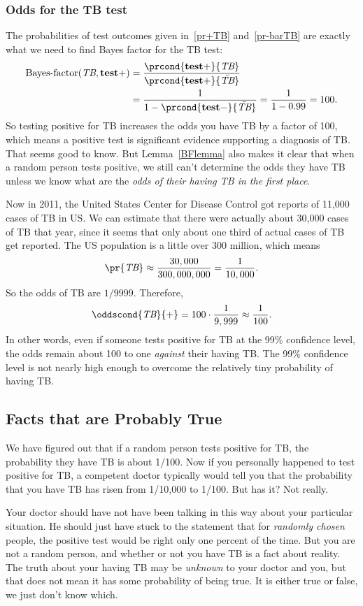 \subsubsection{Odds for the TB test}
The probabilities of test outcomes given in~\eqref{pr+TB}
and~\eqref{pr-barTB} are exactly what we need to find Bayes factor for
the TB test:
\begin{align*}
\BF{\TB}{\testplus}
 & =\frac{\prcond{\testplus}{\TB}}{\prcond{\testplus}{\bar{\TB}}}\\
 &  =\frac{1}{1-\prcond{\testminus}{\bar{\TB}}} = \frac{1}{1 - 0.99} = 100.
\end{align*}
So testing positive for TB increases the odds you have TB by a factor
of 100, which means a positive test is significant evidence supporting
a diagnosis of TB.  That seems good to know.  But Lemma~\ref{BFlemma}
also makes it clear that when a random person tests positive, we still
can't determine the odds they have TB unless we know what are the
\emph{odds of their having TB in the first place}.

Now in 2011, the United States Center for Disease Control got reports
of 11,000 cases of TB in US.  We can estimate that there were actually
about 30,000 cases of TB that year, since it seems that only about one
third of actual cases of TB get reported.  The US population is a
little over 300 million, which means
\[
\pr{\TB} \approx \frac{30,000}{300,000,000} = \frac{1}{10,000}.
\]
So the odds of TB are $1/9999$.  Therefore,
\[
\oddscond{\TB}{\text+} = 100 \cdot \frac{1}{9,999} \approx \frac{1}{100}.
\]
In other words, even if someone tests positive for TB at the 99\%
confidence level, the odds remain about 100 to one \emph{against}
their having TB.  The 99\% confidence level is not nearly high enough
to overcome the relatively tiny probability of having TB.

\subsection{Facts that are Probably True}
We have figured out that if a random person tests positive for TB, the
probability they have TB is about 1/100.  Now if you personally
happened to test positive for TB, a competent doctor typically would
tell you that the probability that you have TB has risen from 1/10,000
to 1/100.  But has it?  Not really.

Your doctor should have not have been talking in this way about your
particular situation.  He should just have stuck to the statement that
for \emph{randomly chosen} people, the positive test would be right
only one percent of the time.  But you are not a random person, and
whether or not you have TB is a fact about reality.  The truth about
your having TB may be \emph{unknown} to your doctor and you, but that
does not mean it has some probability of being true.  It is either
true or false, we just don't know which.


